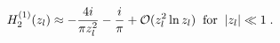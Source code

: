 \begin{equation}
H_2^{(1)} (z_l) \approx -\frac{4 i }{\pi z_l^2} -\frac{i}{\pi}
                         + {\cal O} (z_l^2 \ln z_l) 
\; \; {\rm for} \;\; |z_l| \ll 1 \; .
\label{approx1}
\end{equation}


